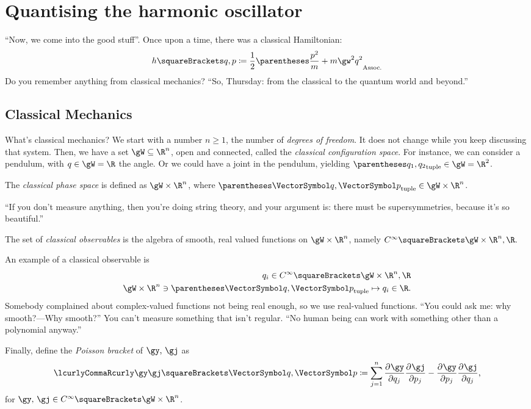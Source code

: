 \documentclass[10pt, a4paper, twoside]{lecturenotes}
\newcommand{\Rn}{{\R^n}}
\begin{document}
\section{Quantising the harmonic oscillator}
``Now, we come into the good stuff''. Once upon a time, there was a classical Hamiltonian:
\[
  h\of{q,p} \DefineAs \frac{1}{2} \pa{\frac{p^2}{m}+m\gw^2 q^2}
\]
Do you remember anything from classical mechanics?
``So, Thursday: from the classical to the quantum world and beyond.''

\subsection{Classical Mechanics}
\NewLecture[date=2013-04-11]
What's classical mechanics? We start with a number $n\geq 1$, the number of \emph{degrees of freedom}. It does not change while you keep discussing that system. Then, we have a set $\gW \Subset \Rn$, open and connected, called the \emph{classical configuration space}.
For instance, we can consider a pendulum, with $q\in\gW = \R$ the angle. Or we could have a joint in the pendulum, yielding $\tuple{q_1,q_2}\in\gW=\R^2$.
\marginfig[The configuration space $\gW=\R$ of a simple pendulum. Here $q\in\R$, as the pendulum can do a full turn---or several---around its pivot.]{\FigureSimplePendulumConfigurationSpace}
\marginfig[The configuration space $\gW=\R^2$ of a double pendulum, where $\vq=\tuple{q_1,q_2}\in\R^2$.]{\FigureDoublePendulumConfigurationSpace}
\marginpar{\vspace*{3cm}}
\begin{definition} The \emph{classical phase space} is defined as $\gW \Cartesian \Rn$, where $\tuple{\vq,\vp}\in\gW \Cartesian \Rn$.
\end{definition}
``If you don't measure anything, then you're doing string theory, and your argument is: there must be supersymmetries, because it's so beautiful.''
\begin{definition} The set of \emph{classical observables} is the algebra of smooth, real valued functions on $\gW\Cartesian\Rn$, namely $\Continf\of{\gW\Cartesian\Rn, \R} \text.$
\end{definition}
An example of a classical observable is
\begin{align*}
q_i\in\Continf\of{\gW\Cartesian\Rn, \R}\\
\FunctionBody{\gW\Cartesian\Rn\owns\tuple{\vq,\vp}}{q_i\in\R}\text.
\end{align*}
Somebody complained about complex-valued functions not being real enough, so we use real-valued functions.
``You could ask me: why smooth?---Why smooth?'' You can't measure something that isn't regular. ``No human being can work with something other than a polynomial anyway.''
\begin{definition}
Finally, define the \emph{Poisson bracket} of $\gy\text{, }\gj$ as
\[
\Poisson{\gy}{\gj}\of{\vq,\vp} \DefineAs \sum{j=1}[n]{\pderiv {q_j}\gy \pderiv {p_j} \gj-\pderiv {p_j}\gy \pderiv {q_j}\gj}
\text,
\]
for $\gy\text{, }\gj\in\Continf\of{\gW\Cartesian\Rn}$.
\end{definition}
\end{document}
